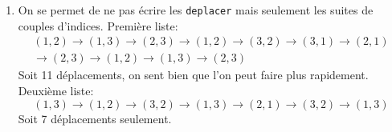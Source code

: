 \begin{enumerate}
  \item On se permet de ne pas écrire les \texttt{deplacer} mais seulement les suites de couples d'indices.\newline
Première liste:
\begin{multline*}
(1,2)\rightarrow (1,3) \rightarrow (2,3)  \rightarrow (1,2)  \rightarrow (3,2)  \rightarrow (3,1)  \rightarrow (2,1) \\
 \rightarrow (2,3)  \rightarrow (1,2)  \rightarrow (1,3)  \rightarrow (2,3)
\end{multline*}
Soit 11 déplacements, on sent bien que l'on peut faire plus rapidement.\newline
Deuxième liste:
\begin{displaymath}
(1,3)\rightarrow (1,2) \rightarrow (3,2)  \rightarrow (1,3)  \rightarrow (2,1)  \rightarrow (3,2)  \rightarrow (1,3) 
\end{displaymath}
Soit 7 déplacements seulement.


\end{enumerate}
